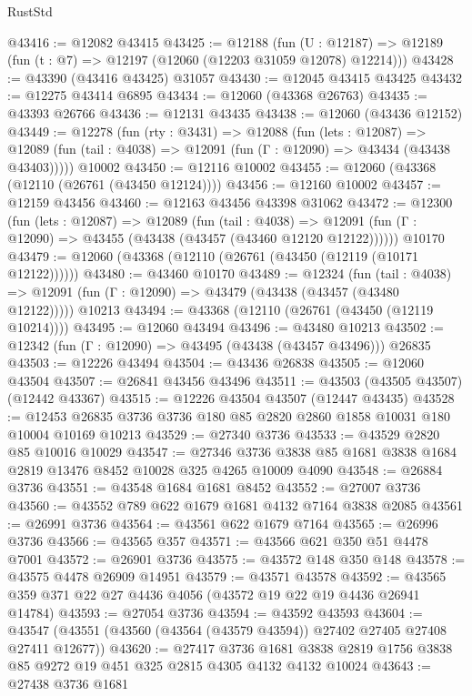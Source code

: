 \begin{lexlean}{RustStd}
\begin{coremodule}
@43416 := @12082 @43415
@43425 := @12188
    (fun (U : @12187) => @12189 (fun (t : @7) => @12197 (@12060 (@12203 @31059 @12078) @12214)))
@43428 := @43390 (@43416 @43425) @31057
@43430 := @12045 @43415 @43425
@43432 := @12275 @43414 @6895
@43434 := @12060 (@43368 @26763)
@43435 := @43393 @26766
@43436 := @12131 @43435
@43438 := @12060 (@43436 @12152)
@43449 := @12278
    (fun (rty : @3431) =>
    @12088
      (fun (lets : @12087) =>
      @12089 (fun (tail : @4038) => @12091 (fun (Γ : @12090) => @43434 (@43438 @43403)))))
    @10002
@43450 := @12116 @10002
@43455 := @12060 (@43368 (@12110 (@26761 (@43450 @12124))))
@43456 := @12160 @10002
@43457 := @12159 @43456
@43460 := @12163 @43456 @43398 @31062
@43472 := @12300
    (fun (lets : @12087) =>
    @12089
      (fun (tail : @4038) =>
      @12091 (fun (Γ : @12090) => @43455 (@43438 (@43457 (@43460 @12120 @12122))))))
    @10170
@43479 := @12060 (@43368 (@12110 (@26761 (@43450 (@12119 (@10171 @12122))))))
@43480 := @43460 @10170
@43489 := @12324
    (fun (tail : @4038) => @12091 (fun (Γ : @12090) => @43479 (@43438 (@43457 (@43480 @12122)))))
    @10213
@43494 := @43368 (@12110 (@26761 (@43450 (@12119 @10214))))
@43495 := @12060 @43494
@43496 := @43480 @10213
@43502 := @12342 (fun (Γ : @12090) => @43495 (@43438 (@43457 @43496))) @26835
@43503 := @12226 @43494
@43504 := @43436 @26838
@43505 := @12060 @43504
@43507 := @26841 @43456 @43496
@43511 := @43503 (@43505 @43507) (@12442 @43367)
@43515 := @12226 @43504 @43507 (@12447 @43435)
@43528 := @12453 @26835 @3736 @3736 @180 @85 @2820 @2860 @1858 @10031 @180 @10004 @10169 @10213
@43529 := @27340 @3736
@43533 := @43529 @2820 @85 @10016 @10029
@43547 := @27346 @3736 @3838 @85 @1681 @3838 @1684 @2819 @13476 @8452 @10028 @325 @4265 @10009 @4090
@43548 := @26884 @3736
@43551 := @43548 @1684 @1681 @8452
@43552 := @27007 @3736
@43560 := @43552 @789 @622 @1679 @1681 @4132 @7164 @3838 @2085
@43561 := @26991 @3736
@43564 := @43561 @622 @1679 @7164
@43565 := @26996 @3736
@43566 := @43565 @357
@43571 := @43566 @621 @350 @51 @4478 @7001
@43572 := @26901 @3736
@43575 := @43572 @148 @350 @148
@43578 := @43575 @4478 @26909 @14951
@43579 := @43571 @43578
@43592 := @43565 @359 @371 @22 @27 @4436 @4056 (@43572 @19 @22 @19 @4436 @26941 @14784)
@43593 := @27054 @3736
@43594 := @43592 @43593
@43604 := @43547 (@43551 (@43560 (@43564 (@43579 @43594)) @27402 @27405 @27408 @27411 @12677))
@43620 := @27417
    @3736
    @1681
    @3838
    @2819
    @1756
    @3838
    @85
    @9272
    @19
    @451
    @325
    @2815
    @4305
    @4132
    @4132
    @10024
@43643 := @27438
    @3736
    @1681

\end{coremodule}
\end{lexlean}

